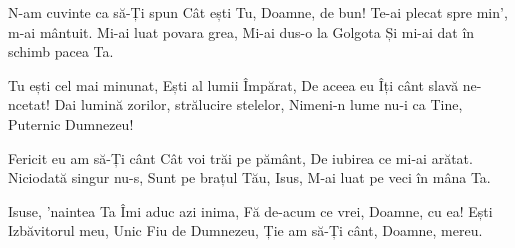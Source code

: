 \beginverse
N-am cuvinte ca să-Ți spun
Cât ești Tu, Doamne, de bun!
Te-ai plecat spre min', m-ai mântuit.
Mi-ai luat povara grea,
Mi-ai dus-o la Golgota
Și mi-ai dat în schimb pacea Ta.
\endverse

\beginchorus
Tu ești cel mai minunat,
Ești al lumii Împărat,
De aceea eu Îți cânt slavă ne-ncetat!
Dai lumină zorilor, strălucire stelelor,
Nimeni-n lume nu-i ca Tine,
Puternic Dumnezeu!
\endchorus

\beginverse
Fericit eu am să-Ți cânt
Cât voi trăi pe pământ,
De iubirea ce mi-ai arătat.
Niciodată singur nu-s,
Sunt pe brațul Tău, Isus,
M-ai luat pe veci în mâna Ta.
\endverse

\beginverse
Isuse, 'naintea Ta
Îmi aduc azi inima,
Fă de-acum ce vrei, Doamne, cu ea!
Ești Izbăvitorul meu,
Unic Fiu de Dumnezeu,
Ție am să-Ți cânt, Doamne, mereu.
\endverse
\endsong